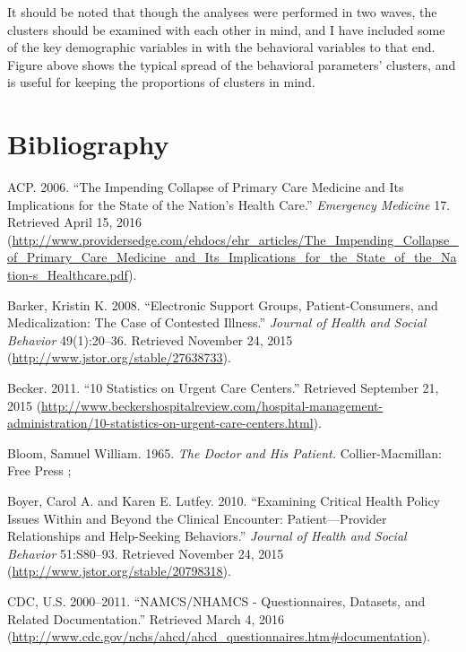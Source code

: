 \documentclass[12pt,twoside]{reedthesis}
\begin{document}
  It should be noted that though the analyses were performed in two waves,
  the clusters should be examined with each other in mind, and I have
  included some of the key demographic variables in with the behavioral
  variables to that end. Figure above shows the typical spread of the
  behavioral parameters' clusters, and is useful for keeping the
  proportions of clusters in mind.
  
  \backmatter
  
  \chapter*{Bibliography}\label{bibliography}
  
  \noindent
  \setlength{\parindent}{-0.20in} \setlength{\leftskip}{0.20in}
  \setlength{\parskip}{8pt}
  
  ACP. 2006. ``The Impending Collapse of Primary Care Medicine and Its
  Implications for the State of the Nation's Health Care.''
  \emph{Emergency Medicine} 17. Retrieved April 15, 2016
  (\url{http://www.providersedge.com/ehdocs/ehr_articles/The_Impending_Collapse_of_Primary_Care_Medicine_and_Its_Implications_for_the_State_of_the_Nation-s_Healthcare.pdf}).
  
  Barker, Kristin K. 2008. ``Electronic Support Groups, Patient-Consumers,
  and Medicalization: The Case of Contested Illness.'' \emph{Journal of
  Health and Social Behavior} 49(1):20--36. Retrieved November 24, 2015
  (\url{http://www.jstor.org/stable/27638733}).
  
  Becker. 2011. ``10 Statistics on Urgent Care Centers.'' Retrieved
  September 21, 2015
  (\url{http://www.beckershospitalreview.com/hospital-management-administration/10-statistics-on-urgent-care-centers.html}).
  
  Bloom, Samuel William. 1965. \emph{The Doctor and His Patient.}
  Collier-Macmillan: Free Press ;
  
  Boyer, Carol A. and Karen E. Lutfey. 2010. ``Examining Critical Health
  Policy Issues Within and Beyond the Clinical Encounter:
  Patient---Provider Relationships and Help-Seeking Behaviors.''
  \emph{Journal of Health and Social Behavior} 51:S80--93. Retrieved
  November 24, 2015 (\url{http://www.jstor.org/stable/20798318}).
  
  CDC, U.S. 2000--2011. ``NAMCS/NHAMCS - Questionnaires, Datasets, and
  Related Documentation.'' Retrieved March 4, 2016
  (\url{http://www.cdc.gov/nchs/ahcd/ahcd_questionnaires.htm\#documentation}).
  
\end{document}

